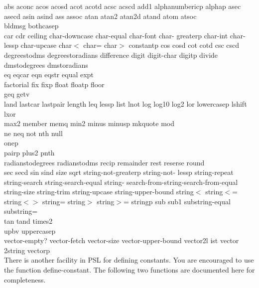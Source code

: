 abs aconc acos acosd acot acotd acsc acscd add1
alphanumbericp alphap asec asecd asin asind ass
assoc atan atan2 atan2d atand atom atsoc\\
 
bldmsg bothcasep\\

car cdr ceiling char-downcase char-equal char-font char-
greaterp char-int char-lessp char-upcase char$<$ char= char$>$ 
constantp cos cosd cot cotd csc cscd\\

degreestodms degreestoradians difference digit digit-char
digitp divide dmstodegrees dmstoradians\\

eq eqcar eqn eqstr equal expt\\

factorial fix fixp float floatp floor\\

geq getv\\

land lastcar lastpair length leq lessp list lnot log log10
log2 lor lowercasep lshift lxor\\

max2 member memq min2 minus minusp mkquote mod\\

ne neq not nth null\\

onep\\

pairp plus2 pnth\\

radianstodegrees radianstodms recip remainder rest reserse 
round\\

sec secd sin sind size sqrt string-not-greaterp string-not-
lessp string-repeat string-search string-search-equal string-
search-from-string-search-from-equal string-size string-trim 
string-upcase string-upper-bound string$<$ string$<$=
string$<$$>$  string= string$>$ string$>$= stringp sub sub1
substring-equal  substring=\\

tan tand times2\\

upbv uppercasep\\

vector-empty? vector-fetch vector-size vector-upper-bound
vector2l ist vector 2string vectorp\\

There is another facility in PSL for defining constants.  You
are  encouraged  to  use  the  function  define-constant. The
following two functions are documented here for completeness.


